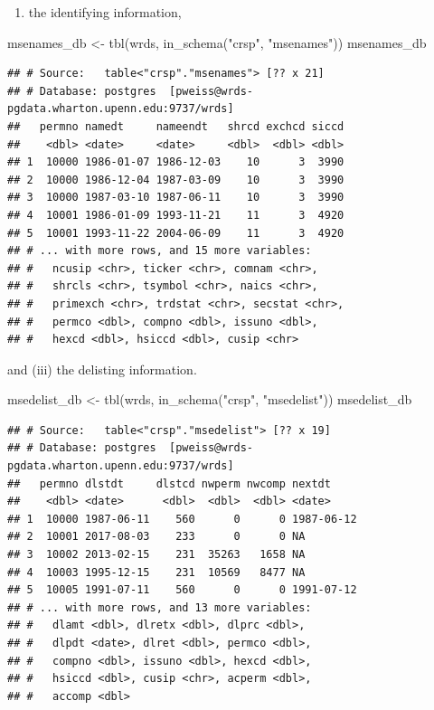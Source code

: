 \documentclass[
]{book}
\newenvironment{Shaded}{\begin{snugshade}}{\end{snugshade}}
\newcommand{\FunctionTok}[1]{\textcolor[rgb]{0,0,0}{#1}}
\newcommand{\NormalTok}[1]{#1}
\newcommand{\OtherTok}[1]{\textcolor[rgb]{0.37,0.37,0.37}{#1}}
\newcommand{\StringTok}[1]{\textcolor[rgb]{0.5,0.5,0.5}{#1}}
\providecommand{\tightlist}{%
  \setlength{\itemsep}{0pt}\setlength{\parskip}{0pt}}
\begin{document}
\begin{enumerate}
\def\labelenumi{(\roman{enumi})}
\setcounter{enumi}{1}
\tightlist
\item
  the identifying information,
\end{enumerate}

\begin{Shaded}
\begin{Highlighting}[]
\NormalTok{msenames\_db }\OtherTok{\textless{}{-}} \FunctionTok{tbl}\NormalTok{(wrds, }\FunctionTok{in\_schema}\NormalTok{(}\StringTok{"crsp"}\NormalTok{, }\StringTok{"msenames"}\NormalTok{))}
\NormalTok{msenames\_db}
\end{Highlighting}
\end{Shaded}

\begin{verbatim}
## # Source:   table<"crsp"."msenames"> [?? x 21]
## # Database: postgres  [pweiss@wrds-pgdata.wharton.upenn.edu:9737/wrds]
##   permno namedt     nameendt   shrcd exchcd siccd
##    <dbl> <date>     <date>     <dbl>  <dbl> <dbl>
## 1  10000 1986-01-07 1986-12-03    10      3  3990
## 2  10000 1986-12-04 1987-03-09    10      3  3990
## 3  10000 1987-03-10 1987-06-11    10      3  3990
## 4  10001 1986-01-09 1993-11-21    11      3  4920
## 5  10001 1993-11-22 2004-06-09    11      3  4920
## # ... with more rows, and 15 more variables:
## #   ncusip <chr>, ticker <chr>, comnam <chr>,
## #   shrcls <chr>, tsymbol <chr>, naics <chr>,
## #   primexch <chr>, trdstat <chr>, secstat <chr>,
## #   permco <dbl>, compno <dbl>, issuno <dbl>,
## #   hexcd <dbl>, hsiccd <dbl>, cusip <chr>
\end{verbatim}

and (iii) the delisting information.

\begin{Shaded}
\begin{Highlighting}[]
\NormalTok{msedelist\_db }\OtherTok{\textless{}{-}} \FunctionTok{tbl}\NormalTok{(wrds, }\FunctionTok{in\_schema}\NormalTok{(}\StringTok{"crsp"}\NormalTok{, }\StringTok{"msedelist"}\NormalTok{))}
\NormalTok{msedelist\_db}
\end{Highlighting}
\end{Shaded}

\begin{verbatim}
## # Source:   table<"crsp"."msedelist"> [?? x 19]
## # Database: postgres  [pweiss@wrds-pgdata.wharton.upenn.edu:9737/wrds]
##   permno dlstdt     dlstcd nwperm nwcomp nextdt    
##    <dbl> <date>      <dbl>  <dbl>  <dbl> <date>    
## 1  10000 1987-06-11    560      0      0 1987-06-12
## 2  10001 2017-08-03    233      0      0 NA        
## 3  10002 2013-02-15    231  35263   1658 NA        
## 4  10003 1995-12-15    231  10569   8477 NA        
## 5  10005 1991-07-11    560      0      0 1991-07-12
## # ... with more rows, and 13 more variables:
## #   dlamt <dbl>, dlretx <dbl>, dlprc <dbl>,
## #   dlpdt <date>, dlret <dbl>, permco <dbl>,
## #   compno <dbl>, issuno <dbl>, hexcd <dbl>,
## #   hsiccd <dbl>, cusip <chr>, acperm <dbl>,
## #   accomp <dbl>
\end{verbatim}
\end{document}
